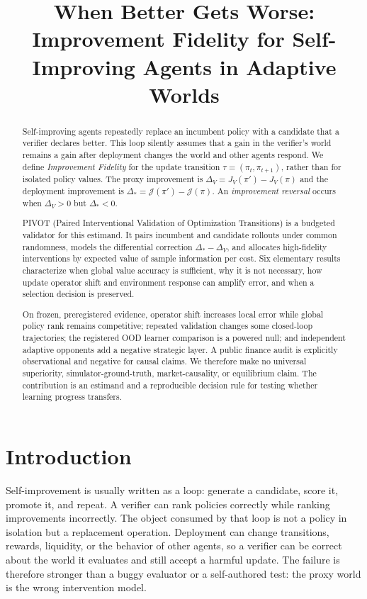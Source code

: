 \documentclass{article}
\title{When Better Gets Worse: Improvement Fidelity for Self-Improving Agents in Adaptive Worlds}
\author{}
\date{}
\newcommand{\J}{\mathcal{J}}
\newcommand{\dproxy}{\Delta_V}
\newcommand{\dtrue}{\Delta_*}
\newcommand{\pii}{\pi}
\newcommand{\pip}{\pi'}
\begin{document}
\maketitle

\begin{abstract}
Self-improving agents repeatedly replace an incumbent policy with a candidate
that a verifier declares better.  This loop silently assumes that a gain in
the verifier's world remains a gain after deployment changes the world and
other agents respond.  We define \emph{Improvement Fidelity} for the update
transition $\tau=(\pi_t,\pi_{t+1})$, rather than for isolated policy values.
The proxy improvement is $\dproxy=J_V(\pip)-J_V(\pii)$ and the deployment
improvement is $\dtrue=\J(\pip)-\J(\pii)$.  An \emph{improvement reversal}
occurs when $\dproxy>0$ but $\dtrue<0$.

PIVOT (Paired Interventional Validation of Optimization Transitions) is a
budgeted validator for this estimand.  It pairs incumbent and candidate
rollouts under common randomness, models the differential correction
$\Delta_* - \Delta_V$, and allocates high-fidelity interventions by expected
value of sample information per cost.  Six elementary results characterize
when global value accuracy is sufficient, why it is not necessary, how update
operator shift and environment response can amplify error, and when a
selection decision is preserved.

On frozen, preregistered evidence, operator shift increases local error while
global policy rank remains competitive; repeated validation changes some
closed-loop trajectories; the registered OOD learner comparison is a powered
null; and independent adaptive opponents add a negative strategic layer.  A
public finance audit is explicitly observational and negative for causal
claims.  We therefore make no universal superiority, simulator-ground-truth,
market-causality, or equilibrium claim.  The contribution is an estimand and
a reproducible decision rule for testing whether learning progress transfers.
\end{abstract}

\section{Introduction}
Self-improvement is usually written as a loop: generate a candidate, score it,
promote it, and repeat.  A verifier can rank policies correctly while ranking improvements incorrectly.
The object consumed by that loop is not a policy in
isolation but a replacement operation.  Deployment can change transitions,
rewards, liquidity, or the behavior of other agents, so a verifier can be
correct about the world it evaluates and still accept a harmful update.  The
failure is therefore stronger than a buggy evaluator or a self-authored test:
the proxy world is the wrong intervention model.
\end{document}
